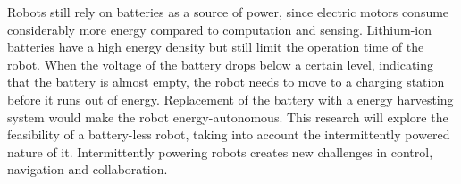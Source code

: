 \documentclass[../MainPaper.tex]{subfiles}
\begin{document}
Robots still rely on batteries as a source of power, since electric motors consume considerably more energy compared to computation and sensing.
Lithium-ion batteries have a high energy density but still limit the operation time of the robot.
When the voltage of the battery drops below a certain level, indicating that the battery is almost empty, the robot needs to move to a charging station before it runs out of energy.
Replacement of the battery with a energy harvesting system would make the robot energy-autonomous. 
This research will explore the feasibility of a battery-less robot, taking into account the intermittently powered nature of it.
Intermittently powering robots creates new challenges in control, navigation and collaboration.






\end{document}
